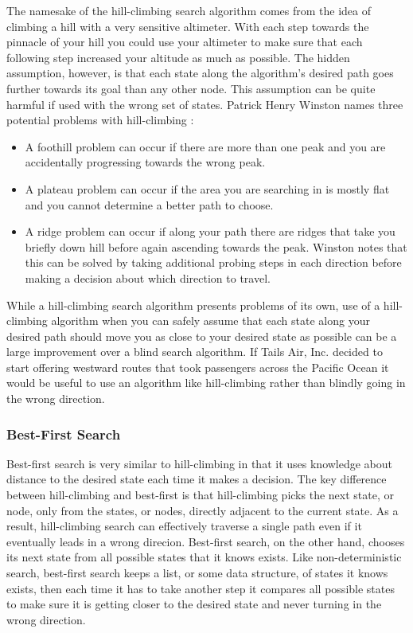 The namesake of the hill-climbing search algorithm comes from the idea of
climbing a hill with a very sensitive altimeter.  With each step towards the
pinnacle of your hill you could use your altimeter to make sure that each
following step increased your altitude as much as possible.  The hidden
assumption, however, is that each state along the algorithm's desired path goes
further towards its goal than any other node.  This assumption can be quite
harmful if used with the wrong set of states.  Patrick Henry Winston names three
potential problems with hill-climbing \cite{winston1992}:

\begin{itemize}\itemsep-4pt
    \item A foothill problem can occur if there are more than one peak and you
    are accidentally progressing towards the wrong peak.
    \item A plateau problem can occur if the area you are searching in is
    mostly flat and you cannot determine a better path to choose.
    \item A ridge problem can occur if along your path there are ridges that
    take you briefly down hill before again ascending towards the peak.  Winston
    notes that this can be solved by taking additional probing steps in each
    direction before making a decision about which direction to travel.
\end{itemize}

While a hill-climbing search algorithm presents problems of its own, use of a
hill-climbing algorithm when you can safely assume that each state along your
desired path should move you as close to your desired state as possible can be a
large improvement over a blind search algorithm.  If Tails Air, Inc. decided to
start offering westward routes that took passengers across the Pacific Ocean it
would be useful to use an algorithm like hill-climbing rather than blindly going
in the wrong direction.

\subsubsection{Best-First Search}
Best-first search is very similar to hill-climbing in that it uses knowledge
about distance to the desired state each time it makes a decision.  The key
difference between hill-climbing and best-first is that hill-climbing picks the
next state, or node, only from the states, or nodes, directly adjacent to the
current state.  As a result, hill-climbing search can effectively traverse a
single path even if it eventually leads in a wrong direcion.  Best-first search,
on the other hand, chooses its next state from all possible states that it knows
exists.  Like non-deterministic search, best-first search keeps a list, or some
data structure, of states it knows exists, then each time it has to take another
step it compares all possible states to make sure it is getting closer to the
desired state and never turning in the wrong direction.

